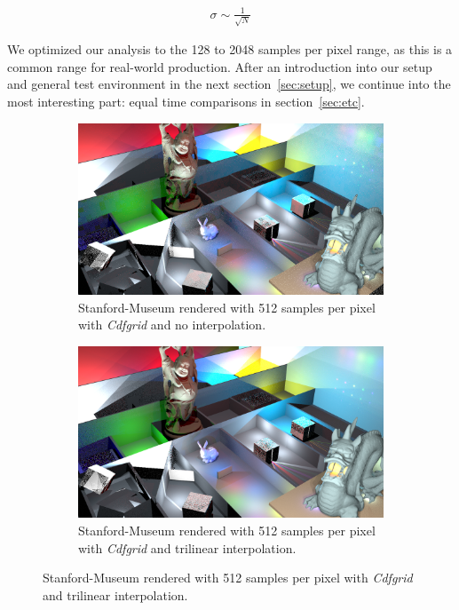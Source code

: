 \begin{align}\label{eq:sigmaCor}
\sigma \sim \frac{1}{\sqrt{N}}
\end{align}

We optimized our analysis to the 128 to 2048 samples per pixel range, as this is a common range for real-world production. After an introduction into our setup and general test environment in the next section~\ref{sec:setup}, we continue into the most interesting part: equal time comparisons in section~\ref{sec:etc}.


\begin{figure}
\centering
\begin{subfigure}[b]{1\textwidth}
   \includegraphics[width=1\linewidth]{figures/examples/StanfordMuseum_pvox_ps512_t503_icdf-0_pc96000k_mc0,1_Vox96_8854.png}
   \caption{Stanford-Museum rendered with 512 samples per pixel with \textit{Cdfgrid} and no interpolation.}
   \label{fig:SMnoInt} 
\end{subfigure}

\begin{subfigure}[b]{1\textwidth}
   \includegraphics[width=1\linewidth]{figures/examples/StanfordMuseum_pvox_ps512_t723_icdf-1_pc128000k_mc0,1_Vox64_17574.png}
   \caption{Stanford-Museum rendered with 512 samples per pixel with \textit{Cdfgrid} and trilinear interpolation.}
   \label{fig:SMInt}
\end{subfigure}


\end{figure}
